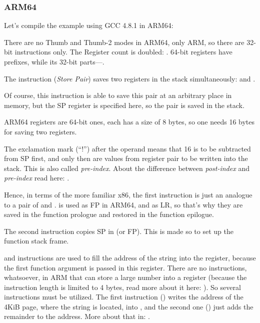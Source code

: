 ﻿\subsubsection{ARM64}


Let's compile the example using GCC 4.8.1 in ARM64:



There are no Thumb and Thumb-2 modes in ARM64, only ARM, so there are 32-bit instructions only.
The Register count is doubled: .
64-bit registers have  prefixes, while its 32-bit parts---.

The  instruction (\emph{Store Pair}) 
saves two registers in the stack simultaneously:  and .

Of course, this instruction is able to save this pair at an arbitrary place in memory, 
but the \ac{SP} register is specified here, so the pair is saved in the stack.

ARM64 registers are 64-bit ones, each has a size of 8 bytes, so one needs 16 bytes for saving two registers.

The exclamation mark (``!'') after the operand means that 16 is to be subtracted from \ac{SP} first, and only then
are values from register pair to be written into the stack.
This is also called \emph{pre-index}.
About the difference between \emph{post-index} and \emph{pre-index} 
read here: .

Hence, in terms of the more familiar x86, the first instruction is just an analogue to a pair of
 and .
 is used as \ac{FP} in ARM64, and  
as \ac{LR}, so that's why they are saved in the function prologue and restored in the function epilogue.

The second instruction copies \ac{SP} in  (or \ac{FP}).
This is made so to set up the function stack frame.

\label{pointers_ADRP_and_ADD}
 and \ADD instructions are used to fill the 
address of the string  into the  register, 
because the first function argument is passed
in this register.
There are no instructions, whatsoever, in ARM that can store a large number into a register (because the instruction
length is limited to 4 bytes, read more about it here: ).
So several instructions must be utilized. The first instruction () writes the address of the 4KiB page, where the string is
located, into , 
and the second one (\ADD) just adds the remainder to the address.
More about that in: .

